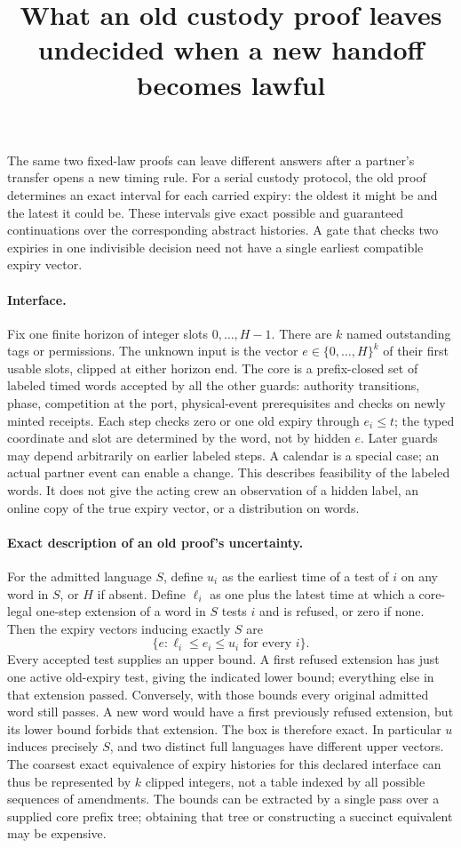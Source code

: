 \documentclass{article}
\title{What an old custody proof leaves undecided when a new handoff becomes lawful}
\begin{document}
\maketitle

The same two fixed-law proofs can leave different answers after a partner's transfer opens a new timing rule. For a serial custody protocol, the old proof determines an exact interval for each carried expiry: the oldest it might be and the latest it could be. These intervals give exact possible and guaranteed continuations over the corresponding abstract histories. A gate that checks two expiries in one indivisible decision need not have a single earliest compatible expiry vector.

\paragraph{Interface.}
Fix one finite horizon of integer slots \(0,\ldots,H-1\). There are \(k\) named outstanding tags or permissions. The unknown input is the vector \(e\in\{0,\ldots,H\}^k\) of their first usable slots, clipped at either horizon end. The core is a prefix-closed set of labeled timed words accepted by all the other guards: authority transitions, phase, competition at the port, physical-event prerequisites and checks on newly minted receipts. Each step checks zero or one old expiry through \(e_i\le t\); the typed coordinate and slot are determined by the word, not by hidden \(e\). Later guards may depend arbitrarily on earlier labeled steps. A calendar is a special case; an actual partner event can enable a change. This describes feasibility of the labeled words. It does not give the acting crew an observation of a hidden label, an online copy of the true expiry vector, or a distribution on words.

\paragraph{Exact description of an old proof's uncertainty.}
For the admitted language \(S\), define \(u_i\) as the earliest time of a test of \(i\) on any word in \(S\), or \(H\) if absent. Define \(\ell_i\) as one plus the latest time at which a core-legal one-step extension of a word in \(S\) tests \(i\) and is refused, or zero if none. Then the expiry vectors inducing exactly \(S\) are
\[
 \{e : \ell_i\le e_i\le u_i\text{ for every }i\}.
\]
Every accepted test supplies an upper bound. A first refused extension has just one active old-expiry test, giving the indicated lower bound; everything else in that extension passed. Conversely, with those bounds every original admitted word still passes. A new word would have a first previously refused extension, but its lower bound forbids that extension. The box is therefore exact. In particular \(u\) induces precisely \(S\), and two distinct full languages have different upper vectors. The coarsest exact equivalence of expiry histories for this declared interface can thus be represented by \(k\) clipped integers, not a table indexed by all possible sequences of amendments. The bounds can be extracted by a single pass over a supplied core prefix tree; obtaining that tree or constructing a succinct equivalent may be expensive.
\end{document}
